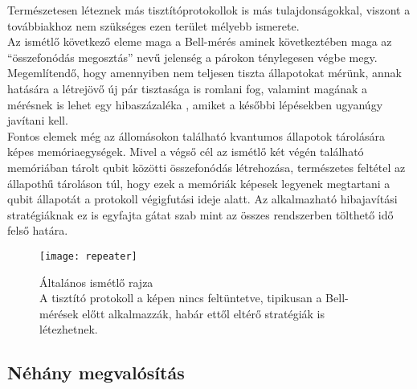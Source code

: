 Természetesen léteznek más tisztítóprotokollok is más tulajdonságokkal, viszont a továbbiakhoz nem szükséges ezen terület mélyebb ismerete.%
\\
Az ismétlő következő eleme maga a Bell-mérés aminek következtében maga az ``összefonódás megosztás'' nevű jelenség a párokon ténylegesen végbe megy. Megemlítendő, hogy amennyiben nem teljesen tiszta állapotokat mérünk, annak hatására a létrejövő új pár tisztasága is romlani fog, valamint magának a mérésnek is lehet egy hibaszázaléka \cite{lutkenhaus1999bell}, amiket a későbbi lépésekben ugyanúgy javítani kell.\\
Fontos elemek még az állomásokon található kvantumos állapotok tárolására képes memóriaegységek. Mivel a végső cél az ismétlő két végén található memóriában tárolt qubit közötti összefonódás létrehozása, természetes feltétel az állapothű tároláson túl, hogy ezek a memóriák képesek legyenek megtartani a qubit állapotát a protokoll végigfutási ideje alatt. Az alkalmazható hibajavítási stratégiáknak ez is egyfajta gátat szab mint az összes rendszerben tölthető idő felső határa. \\
\begin{figure}[H]
\centering
\texttt{[image: repeater]}
\caption[Általános ismétlő]{Általános ismétlő rajza\\ A tisztító protokoll a képen nincs feltüntetve, tipikusan a Bell-mérések előtt alkalmazzák, habár ettől eltérő stratégiák is létezhetnek.}
\end{figure}

\subsection{Néhány megvalósítás}

